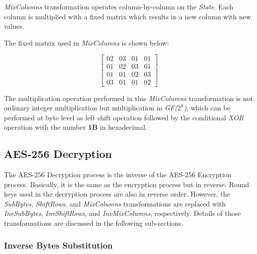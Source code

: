 \documentclass[a4paper, 10pt]{article}
\begin{document}
\begin{multicols}{2}
            \textit{MixColumns} transformation operates column-by-column on the \textit{State}. Each column is multiplied with a fixed matrix which results in a new column with new values.

            The fixed matrix used in \textit{MixColumns} is shown below:

            \begin{equation}
            \begin{bmatrix}
                02 & 03 & 01 & 01\\
                01 & 02 & 03 & 01\\
                01 & 01 & 02 & 03\\
                03 & 01 & 01 & 02
            \end{bmatrix}
            \label{equ:mixcolumns-matrix}
        \end{equation}

        The multiplication operation performed in this \textit{MixColumns} transformation is not ordinary integer multiplication but multiplication in \textit{GF($2^{8}$)}, which can be performed at byte level as left shift operation followed by the conditional \textit{XOR} operation with the number \textbf{1B} in hexadecimal.

            \subsection{AES-256 Decryption}

	The AES-256 Decryption process is the inverse of the AES-256 Encryption process. Basically, it is the same as the encryption process but in reverse. Round keys used in the decryption process are also in reverse order. However, the \textit{SubBytes}, \textit{ShiftRows}, and \textit{MixColumns} transformations are replaced with \textit{InvSubBytes}, \textit{InvShiftRows}, and \textit{InvMixColumns}, respectively. Details of those transformations are discussed in the following sub-sections.

            \subsubsection{Inverse Bytes Substitution}


\end{multicols}
\end{document}
